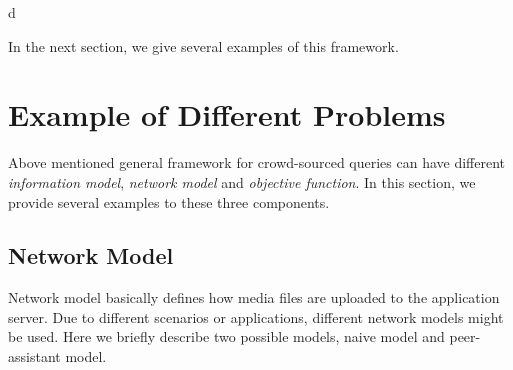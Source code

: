 d\documentclass[letterpaper]{sig-alternate-10pt}
\begin{document}
In the next section, we give several examples of this framework.




\section{Example of Different Problems}

Above mentioned general framework for crowd-sourced queries can have different \emph{information model}, \emph{network model} and \emph{objective function}. In this section, we provide several examples to these three components.

\subsection{Network Model}

Network model basically defines how media files are uploaded to the application server. Due to different scenarios or applications, different network models might be used. Here we briefly describe two possible models, naive model and peer-assistant model.
\end{document}

